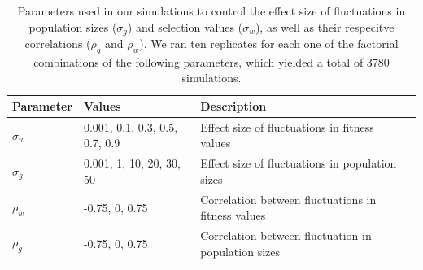 \documentclass[12pt]{article}
\begin{document}
\begin{table}[h]
\fontsize{10}{18}\selectfont
\centering
\caption{Parameters used in our simulations to control the effect size of fluctuations in population sizes ($\sigma_{g}$) and selection values ($\sigma_{w}$), as well as their respecitve correlations ($\rho_{g}$ and $\rho_{w}$). We ran ten replicates for each one  of the factorial combinations of the following parameters, which yielded a total of 3780 simulations. }
\begin{tabular}{@{}llll@{}}
\toprule
Parameter                    & Values                    & Description                                   &  \\ \midrule
$\sigma_{w}$ & 0.001, 0.1, 0.3, 0.5, 0.7, 0.9 & Effect size of fluctuations in fitness values &  \\
$\sigma_{g}$ & 0.001, 1, 10, 20, 30, 50 & Effect size of fluctuations in population sizes                                              &  \\
$\rho_{w}$  &  -0.75, 0, 0.75                         &   Correlation between fluctuations in fitness values                                            &  \\
$\rho_{g}$  &   -0.75, 0, 0.75                        &  Correlation between fluctuation in population sizes                                             &  \\ \bottomrule
\end{tabular}
\label{tab:fluctuations}
\end{table}
\end{document}
